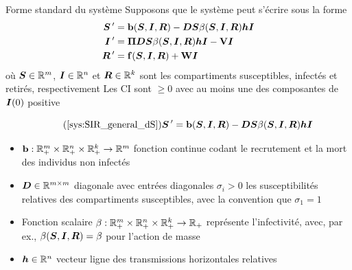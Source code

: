 \documentclass[aspectratio=169]{beamer}\usepackage[]{graphicx}\usepackage[]{xcolor}
\begin{document}
\begin{frame}{Forme standard du système}
Supposons que le système peut s'écrire sous la forme
\begin{subequations}\label{sys:SIR_general}
\begin{align}
\bm{S}\,' &= \mathbf{b}(\bm{S},\bm{I},\bm{R})-\bm{D}\bm{S}\beta(\bm{S},\bm{I},\bm{R})\bm{h}\bm{I} \label{sys:SIR_general_dS} \\
\bm{I}\,' &= \bm{\Pi}\bm{D}\bm{S}\beta(\bm{S},\bm{I},\bm{R})\bm{h}\bm{I}-\mathbf{V}\bm{I} \label{sys:SIR_general_dI} \\
\bm{R}\,' &= \mathbf{f}(\bm{S},\bm{I},\bm{R})+\mathbf{W}\bm{I} \label{sys:SIR_general_dR}
\end{align}
\end{subequations}
\vfill
où $\bm{S}\in\mathbb{R}^m$, $\bm{I}\in\mathbb{R}^n$ et $\bm{R}\in\mathbb{R}^k$ sont les compartiments susceptibles, infectés et retirés, respectivement
\vfill
Les CI sont $\geq 0$ avec au moins une des composantes de $\bm{I}(0)$ positive
\end{frame}  


\begin{frame}
\begin{equation}\tag{\ref{sys:SIR_general_dS}}
\bS\pprime = \mathbf{b}(\bS,\bI,\bR)-\bD\bS\beta(\bS,\bI,\bR)\bh\bI
\end{equation}
\begin{itemize}
\item $\mathbf{b}:\mathbb{R}_+^m\times\mathbb{R}_+^n\times\mathbb{R}_+^k\to\mathbb{R}^m$ fonction continue codant le recrutement et la mort des individus non infectés
\item $\bm{D}\in\mathbb{R}^{m\times m}$ diagonale avec entrées diagonales $\sigma_i>0$ les susceptibilités relatives des compartiments susceptibles, avec la convention que $\sigma_1=1$
\item Fonction scalaire $\beta:\mathbb{R}_+^m\times\mathbb{R}_+^n\times\mathbb{R}_+^k\to\mathbb{R}_+$ représente l'infectivité, avec, par ex., $\beta(\bm{S},\bm{I},\bm{R})=\beta$ pour l'action de masse
\item $\bm{h}\in\mathbb{R}^{n}$ vecteur ligne des transmissions horizontales relatives
\end{itemize}
\end{frame}  
\end{document}
